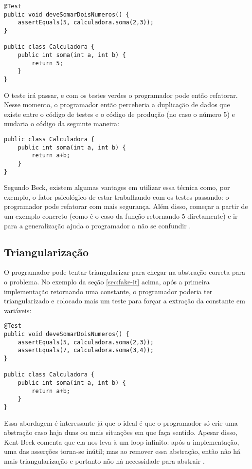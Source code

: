 \begin{lstlisting}[frame=trbl]
@Test
public void deveSomarDoisNumeros() {
	assertEquals(5, calculadora.soma(2,3));
}

public class Calculadora {
	public int soma(int a, int b) {
		return 5;
	}
}
\end{lstlisting}

O teste irá passar, e com os testes verdes o programador pode então refatorar. Nesse momento, o programador então
perceberia a duplicação de dados que existe entre o código de testes e o código de produção (no caso o número 5) e 
mudaria o código da seguinte maneira:

\begin{lstlisting}[frame=trbl]
public class Calculadora {
	public int soma(int a, int b) {
		return a+b;
	}
}
\end{lstlisting}

Segundo Beck, existem algumas vantages em utilizar essa técnica como, por exemplo, o fator psicológico de estar
trabalhando com os testes passando: o programador pode refatorar com mais segurança. Além disso, começar a partir
de um exemplo concreto (como é o caso da função retornando 5 diretamente) e ir para a generalização ajuda o programador
a não se confundir \cite{TDDByExample}.

\subsection{Triangularização}
\label{sec:triangularizacao}

O programador pode tentar triangularizar para chegar na abstração correta para o problema. No exemplo da seção \ref{sec:fake-it} acima, 
após a primeira implementação retornando uma constante, o programador poderia ter triangularizado e colocado mais um teste para
forçar a extração da constante em variáveis:

\begin{lstlisting}[frame=trbl]
@Test
public void deveSomarDoisNumeros() {
	assertEquals(5, calculadora.soma(2,3));
	assertEquals(7, calculadora.soma(3,4));
}

public class Calculadora {
	public int soma(int a, int b) {
		return a+b;
	}
}
\end{lstlisting}

Essa abordagem é interessante já que o ideal é que o programador só crie uma abstração caso haja duas ou mais situações em que
faça sentido. Apesar disso, Kent Beck comenta que ela nos leva à um loop infinito: após a implementação, uma das asserções torna-se
inútil; mas ao remover essa abstração, então não há mais triangularização e portanto não há necessidade para abstrair \cite{TDDByExample}.

